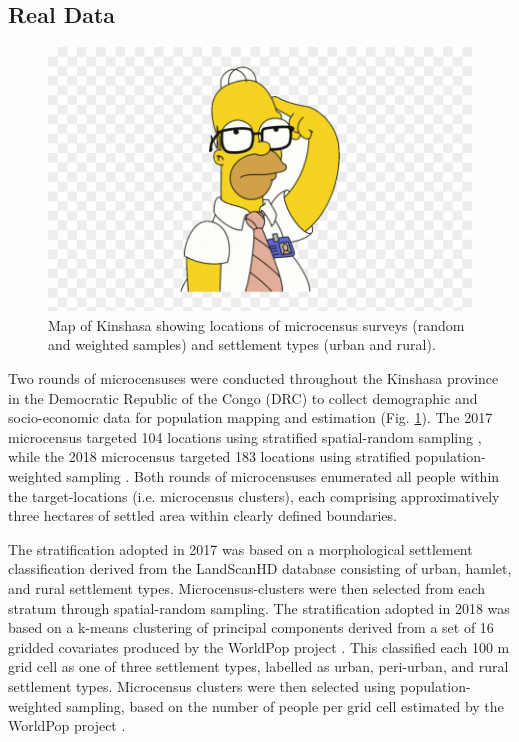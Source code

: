\documentclass[9pt,twocolumn,twoside,lineno]{pnas-new}
\begin{document}
{	\subsection{Real Data}
	
	\begin{figure}
		\centering
		\includegraphics[width=1\linewidth]{doh.png}
		\caption{Map of Kinshasa showing locations of microcensus surveys (random and weighted samples) and settlement types (urban and rural).}
		\label{fig:kinshasa}
	\end{figure}
	
	Two rounds of microcensuses were conducted throughout the Kinshasa province in the Democratic Republic of the Congo (DRC) to collect demographic and socio-economic data for population mapping and estimation (Fig. \ref{fig:kinshasa}). The 2017 microcensus targeted 104 locations using stratified spatial-random sampling \cite{}, while the 2018 microcensus targeted 183 locations using stratified population-weighted sampling \cite{}. Both rounds of microcensuses enumerated all people within the target-locations (i.e. microcensus clusters), each comprising approximatively three hectares of settled area within clearly defined boundaries. 
	
	The stratification adopted in 2017 was based on a morphological settlement classification derived from the LandScanHD database \cite{} consisting of urban, hamlet, and rural settlement types. Microcensus-clusters were then selected from each stratum through spatial-random sampling. The stratification adopted in 2018 was based on a k-means clustering of principal components derived from a set of 16 gridded covariates produced by the WorldPop project \cite{}. This classified each 100 m grid cell as one of three settlement types, labelled as urban, peri-urban, and rural settlement types. Microcensus clusters were then selected using population-weighted sampling, based on the number of people per grid cell estimated by the WorldPop project \cite{}.
	
}
\end{document}

